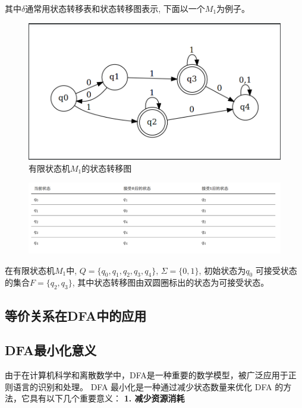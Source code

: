 \documentclass{article}
\begin{document}
    其中$\delta$通常用状态转移表和状态转移图表示, 下面以一个$M_1$为例子。\\
    \begin{figure}[h]
        \centering
        \includegraphics[scale=0.2]{../Img/dfa_example.png}
        \caption{有限状态机$M_1$的状态转移图}
    \end{figure}

    \begin{figure}[h]
        \centering
        \includegraphics[scale=0.3]{../Img/minimized_pic.png}
    \end{figure}
    在有限状态机$M_1$中, $Q=\{q_0, q_1,q_2,q_3,q_4\}$, $\Sigma = \{0,1\}$, 初始状态为$q_0$
    可接受状态的集合$F = \{q_2, q_3\}$, 其中状态转移图由双圆圈标出的状态为可接受状态。


\subsection{等价关系在DFA中的应用}

\subsection{DFA最小化意义}

由于在计算机科学和离散数学中，DFA是一种重要的数学模型，被广泛应用于正则语言的识别和处理。
DFA 最小化是一种通过减少状态数量来优化 DFA 的方法，它具有以下几个重要意义： 
\textbf{1. 减少资源消耗}
\end{document}
